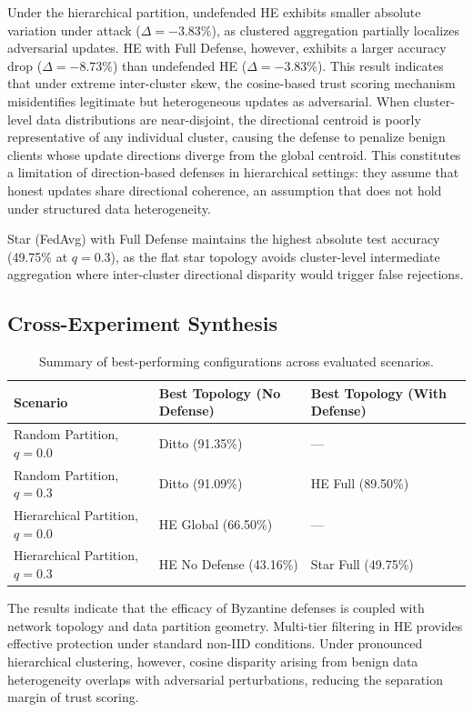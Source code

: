 \documentclass[11pt, a4paper]{article}
\begin{document}
Under the hierarchical partition, undefended HE exhibits smaller absolute variation under attack ($\Delta = -3.83\%$), as clustered aggregation partially localizes adversarial updates. HE with Full Defense, however, exhibits a larger accuracy drop ($\Delta = -8.73\%$) than undefended HE ($\Delta = -3.83\%$). This result indicates that under extreme inter-cluster skew, the cosine-based trust scoring mechanism misidentifies legitimate but heterogeneous updates as adversarial. When cluster-level data distributions are near-disjoint, the directional centroid is poorly representative of any individual cluster, causing the defense to penalize benign clients whose update directions diverge from the global centroid. This constitutes a limitation of direction-based defenses in hierarchical settings: they assume that honest updates share directional coherence, an assumption that does not hold under structured data heterogeneity.

Star (FedAvg) with Full Defense maintains the highest absolute test accuracy (49.75\% at $q=0.3$), as the flat star topology avoids cluster-level intermediate aggregation where inter-cluster directional disparity would trigger false rejections.

\subsection{Cross-Experiment Synthesis}
\begin{table}[H]
    \centering
    \begin{tabular}{lll}
        \toprule
        \textbf{Scenario} & \textbf{Best Topology (No Defense)} & \textbf{Best Topology (With Defense)} \\
        \midrule
        Random Partition, $q=0.0$ & Ditto (91.35\%) & — \\
        Random Partition, $q=0.3$ & Ditto (91.09\%) & HE Full (89.50\%) \\
        Hierarchical Partition, $q=0.0$ & HE Global (66.50\%) & — \\
        Hierarchical Partition, $q=0.3$ & HE No Defense (43.16\%) & Star Full (49.75\%) \\
        \bottomrule
    \end{tabular}
    \caption{Summary of best-performing configurations across evaluated scenarios.}
\end{table}

The results indicate that the efficacy of Byzantine defenses is coupled with network topology and data partition geometry. Multi-tier filtering in HE provides effective protection under standard non-IID conditions. Under pronounced hierarchical clustering, however, cosine disparity arising from benign data heterogeneity overlaps with adversarial perturbations, reducing the separation margin of trust scoring.
\end{document}

